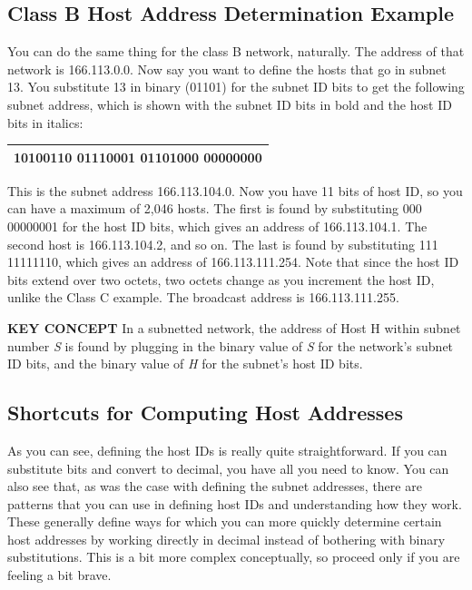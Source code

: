 \documentclass[b5paper,11pt]{memoir}
\begin{document}
\subsection[class B Host Address Determination
Example]{\texorpdfstring{\protect\hypertarget{ch19s05.htmlux5cux23class_b_host_address_determination_examp}{}{}Class
B Host Address Determination
Example}{class B Host Address Determination Example}}

\protect\hypertarget{ch19s05.htmlux5cux23idx-CHP-19-0753}{}{}You can do
the same thing for the class B network, naturally. The address of that
network is 166.113.0.0. Now say you want to define the hosts that go in
subnet 13. You substitute 13 in binary (01101) for the subnet ID bits to
get the following subnet address, which is shown with the subnet ID bits
in bold and the host ID bits in italics:

\begin{longtable}[]{@{}l@{}}
\toprule
\endhead
10100110 01110001 {\textbf{01101}}{000 00000000}\tabularnewline
\bottomrule
\end{longtable}

This is the subnet address 166.113.104.0. Now you have 11 bits of host
ID, so you can have a maximum of 2,046 hosts. The first is found by
substituting 000 00000001 for the host ID bits, which gives an address
of 166.113.104.1. The second host is 166.113.104.2, and so on. The last
is found by substituting 111 11111110, which gives an address of
166.113.111.254. Note that since the host ID bits extend over two
octets, two octets change as you increment the host ID, unlike the Class
C example. The broadcast address is 166.113.111.255.


{\textbf{KEY CONCEPT}} In a subnetted network, the address of Host H
within subnet number {\emph{S}} is found by plugging in the binary value
of {\emph{S}} for the network's subnet ID bits, and the binary value of
{\emph{H}} for the subnet's host ID bits.

\subsection[Shortcuts for Computing Host
Addresses]{\texorpdfstring{\protect\hypertarget{ch19s05.htmlux5cux23shortcuts_for_computing_host_addresses}{}{}Shortcuts
for Computing Host Addresses}{Shortcuts for Computing Host Addresses}}

\protect\hypertarget{ch19s05.htmlux5cux23idx-CHP-19-0754}{}{}\protect\hypertarget{ch19s05.htmlux5cux23idx-CHP-19-0755}{}{}As
you can see, defining the host IDs is really quite straightforward. If
you can substitute bits and convert to decimal, you have all you need to
know. You can also see that, as was the case with defining the subnet
addresses, there are patterns that you can use in defining host IDs and
understanding how they work. These generally define ways for which you
can more quickly determine certain host addresses by working directly in
decimal instead of bothering with binary substitutions. This is a bit
more complex conceptually, so proceed only if you are feeling a bit
brave.
\end{document}
